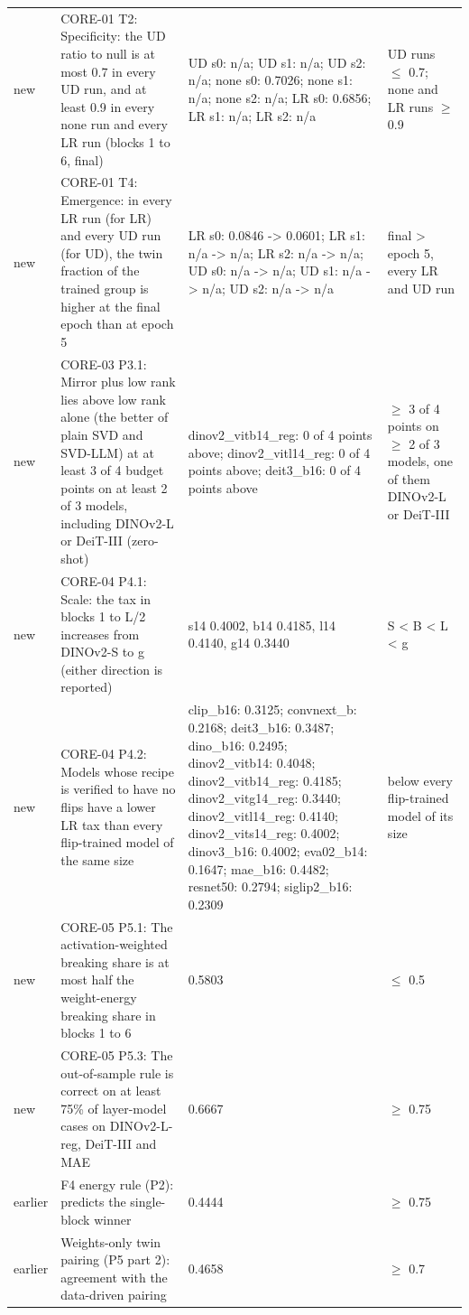 \begin{table}[t]
\begin{tabular}{llll}
new & CORE-01 T2: Specificity: the UD ratio to null is at most 0.7 in every UD run, and at least 0.9 in every none run and every LR run (blocks 1 to 6, final) & UD s0: n/a; UD s1: n/a; UD s2: n/a; none s0: 0.7026; none s1: n/a; none s2: n/a; LR s0: 0.6856; LR s1: n/a; LR s2: n/a & UD runs $\le$ 0.7; none and LR runs $\ge$ 0.9 \\
new & CORE-01 T4: Emergence: in every LR run (for LR) and every UD run (for UD), the twin fraction of the trained group is higher at the final epoch than at epoch 5 & LR s0: 0.0846 -> 0.0601; LR s1: n/a -> n/a; LR s2: n/a -> n/a; UD s0: n/a -> n/a; UD s1: n/a -> n/a; UD s2: n/a -> n/a & final > epoch 5, every LR and UD run \\
new & CORE-03 P3.1: Mirror plus low rank lies above low rank alone (the better of plain SVD and SVD-LLM) at at least 3 of 4 budget points on at least 2 of 3 models, including DINOv2-L or DeiT-III (zero-shot) & dinov2\_vitb14\_reg: 0 of 4 points above; dinov2\_vitl14\_reg: 0 of 4 points above; deit3\_b16: 0 of 4 points above & $\ge$ 3 of 4 points on $\ge$ 2 of 3 models, one of them DINOv2-L or DeiT-III \\
new & CORE-04 P4.1: Scale: the tax in blocks 1 to L/2 increases from DINOv2-S to g (either direction is reported) & s14 0.4002, b14 0.4185, l14 0.4140, g14 0.3440 & S < B < L < g \\
new & CORE-04 P4.2: Models whose recipe is verified to have no flips have a lower LR tax than every flip-trained model of the same size & clip\_b16: 0.3125; convnext\_b: 0.2168; deit3\_b16: 0.3487; dino\_b16: 0.2495; dinov2\_vitb14: 0.4048; dinov2\_vitb14\_reg: 0.4185; dinov2\_vitg14\_reg: 0.3440; dinov2\_vitl14\_reg: 0.4140; dinov2\_vits14\_reg: 0.4002; dinov3\_b16: 0.4002; eva02\_b14: 0.1647; mae\_b16: 0.4482; resnet50: 0.2794; siglip2\_b16: 0.2309 & below every flip-trained model of its size \\
new & CORE-05 P5.1: The activation-weighted breaking share is at most half the weight-energy breaking share in blocks 1 to 6 & 0.5803 & $\le$ 0.5 \\
new & CORE-05 P5.3: The out-of-sample rule is correct on at least 75\% of layer-model cases on DINOv2-L-reg, DeiT-III and MAE & 0.6667 & $\ge$ 0.75 \\
earlier & F4 energy rule (P2): predicts the single-block winner & 0.4444 & $\ge$ 0.75 \\
earlier & Weights-only twin pairing (P5 part 2): agreement with the data-driven pairing & 0.4658 & $\ge$ 0.7 \\

\end{tabular}
\end{table}

